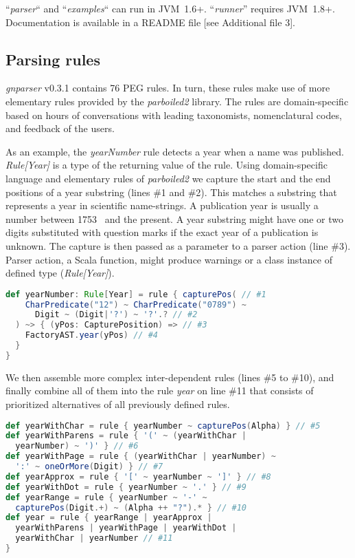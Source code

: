 \documentclass{bmcart}
\begin{document}
``\textit{parser}`` and ``\textit{examples}`` can run in JVM~1.6+.  ``\textit{runner}'' requires JVM~1.8+. Documentation is available in a README file [see Additional file 3].

\subsection*{Parsing rules}


\textit{gnparser} v0.3.1 contains 76 PEG rules. In turn, these rules make use of more elementary rules provided by the \textit{parboiled2} library. The rules are domain-specific based on hours of conversations with leading taxonomists, nomenclatural codes, and feedback of the users.

As an example, the \textit{yearNumber} rule detects a year when a name was published. \textit{Rule[Year]} is a type of the returning value of the rule. Using domain-specific language and elementary rules of \textit{parboiled2} we capture the start and the end positions of a year substring (lines \#1 and \#2). This matches a substring that represents a year in scientific name-strings. A publication year is usually a number between 1753~\cite{Linne1753} and the present. A year substring might have one or two digits substituted with question marks if the exact year of a publication is unknown. The capture is then passed as a parameter to a parser action (line \#3). Parser action,  a Scala function, might produce warnings or a class instance of defined type (\textit{Rule[Year]}).

\begin{lstlisting}[language=scala]
def yearNumber: Rule[Year] = rule { capturePos( // #1
    CharPredicate("12") ~ CharPredicate("0789") ~
      Digit ~ (Digit|'?') ~ '?'.? // #2
  ) ~> { (yPos: CapturePosition) => // #3
    FactoryAST.year(yPos) // #4
  }
}
\end{lstlisting}

We then assemble more complex inter-dependent rules (lines \#5 to \#10), and finally combine all of them into the rule \textit{year} on line \#11 that consists of prioritized alternatives of all previously defined rules.

\begin{lstlisting}[language=scala]
def yearWithChar = rule { yearNumber ~ capturePos(Alpha) } // #5
def yearWithParens = rule { '(' ~ (yearWithChar |
  yearNumber) ~ ')' } // #6
def yearWithPage = rule { (yearWithChar | yearNumber) ~
  ':' ~ oneOrMore(Digit) } // #7
def yearApprox = rule { '[' ~ yearNumber ~ ']' } // #8
def yearWithDot = rule { yearNumber ~ '.' } // #9
def yearRange = rule { yearNumber ~ '-' ~
  capturePos(Digit.+) ~ (Alpha ++ "?").* } // #10
def year = rule { yearRange | yearApprox |
  yearWithParens | yearWithPage | yearWithDot |
  yearWithChar | yearNumber // #11
}
\end{lstlisting}
\end{document}
